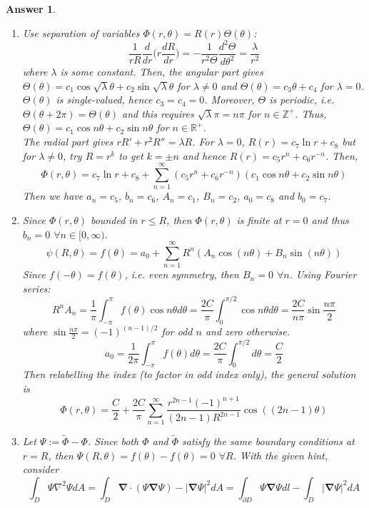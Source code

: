 \documentclass[a4paper]{article}
\newtheorem{ans}{Answer}[section]
\theoremstyle{new}
\begin{document}
\newpage
\begin{ans}\leavevmode
\begin{enumerate}[label=(\roman*)]
\item Use separation of variables $\Phi(r,\theta)=R(r)\Theta(\theta)$:
$$\frac{1}{rR}\frac{d}{dr}\bigg(r\frac{dR}{dr}\bigg)=-\frac{1}{r^2\Theta}\frac{d^2\Theta}{d\theta^2}=\frac{\lambda}{r^2}$$
where $\lambda$ is some constant. Then, the angular part gives $\Theta(\theta)=c_1\cos\sqrt{\lambda}\theta+c_2\sin\sqrt{\lambda}\theta$ for $\lambda\neq 0$ and $\Theta(\theta)=c_3\theta+c_4$ for $\lambda=0$. $\Theta(\theta)$ is single-valued, hence $c_3=c_4=0$. Moreover, $\Theta$ is periodic, i.e. $\Theta(\theta+2\pi)=\Theta(\theta)$ and this requires $\sqrt{\lambda}\pi=n\pi$ for $n\in\mathbb{Z}^+$. Thus, $\Theta(\theta)=c_1\cos n\theta+c_2\sin n\theta$ for $n\in\mathbb{R}^+$.\\[5pt]
The radial part gives $rR'+r^2R''=\lambda R$. For $\lambda=0$, $R(r)=c_7\ln r+c_8$ but for $\lambda\neq 0$, try $R=r^k$ to get $k=\pm n$ and hence $R(r)=c_5r^n+c_6r^{-n}$. Then,
$$\Phi(r,\theta)=c_7\ln r+c_8+\sum_{n=1}^\infty(c_5r^n+c_6r^{-n})(c_1\cos n\theta+c_2\sin n\theta)$$
Then we have $a_n=c_5$, $b_n=c_6$, $A_n=c_1$, $B_n=c_2$,  $a_0=c_8$ and $b_0=c_7$.
\item Since $\Phi(r,\theta)$ bounded in $r\leq R$, then $\Phi(r,\theta)$ is finite at $r=0$ and thus $b_n=0$ $\forall n\in[0,\infty)$.
$$\psi(R,\theta)=f(\theta)=a_0+\sum_{n=1}^\infty R^n(A_n\cos(n\theta)+B_n\sin(n\theta))$$
Since $f(-\theta)=f(\theta)$, i.e. even symmetry, then $B_n=0$ $\forall n$. Using Fourier series:
$$R^nA_n=\frac{1}{\pi}\int_{-\pi}^\pi f(\theta)\cos n\theta d\theta=\frac{2C}{\pi}\int_0^{\pi/2}\cos n\theta d\theta=\frac{2C}{n\pi}\sin\frac{n\pi}{2}$$
where $\sin\frac{n\pi}{2}=(-1)^{(n-1)/2}$ for odd $n$ and zero otherwise.
$$a_0=\frac{1}{2\pi}\int_{-\pi}^\pi f(\theta) d\theta=\frac{2C}{\pi}\int_0^{\pi/2}d\theta=\frac{C}{2}$$
Then relabelling the index (to factor in odd index only), the general solution is
$$\Phi(r,\theta)=\frac{C}{2}+\frac{2C}{\pi}\sum_{n=1}^\infty\frac{r^{2n-1}(-1)^{n+1}}{(2n-1)R^{2n-1}}\cos((2n-1)\theta)$$
\item Let $\Psi:=\tilde{\Phi}-\Phi$. Since both $\Phi$ and $\tilde{\Phi}$ satisfy the same boundary conditions at $r=R$, then $\Psi(R,\theta)=f(\theta)-f(\theta)=0$ $\forall R$. With the given hint, consider
$$\int_D\Psi\nabla^2\Psi dA=\int_D\boldsymbol{\nabla}\cdot(\Psi\boldsymbol{\nabla}\Psi)-|\boldsymbol{\nabla}\Psi|^2dA=\int_{\partial D}\Psi\boldsymbol{\nabla}\Psi dl-\int_D|\boldsymbol{\nabla}\Psi|^2dA$$

\end{enumerate}
\end{ans}
\end{document}
